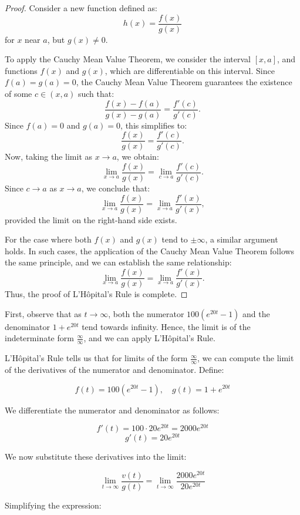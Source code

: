 \documentclass[12pt,a4paper]{article}
\begin{document}
\begin{remark}
\begin{proof}
Consider a new function defined as:
\[
h(x) = \frac{f(x)}{g(x)}
\]
for \( x \) near \( a \), but \( g(x) \neq 0 \).

To apply the Cauchy Mean Value Theorem, we consider the interval \( [x, a] \), and functions \( f(x) \) and \( g(x) \), which are differentiable on this interval. Since \( f(a) = g(a) = 0 \), the Cauchy Mean Value Theorem guarantees the existence of some \( c \in (x, a) \) such that:
\[
\frac{f(x) - f(a)}{g(x) - g(a)} = \frac{f'(c)}{g'(c)}.
\]
Since \( f(a) = 0 \) and \( g(a) = 0 \), this simplifies to:
\[
\frac{f(x)}{g(x)} = \frac{f'(c)}{g'(c)}.
\]
Now, taking the limit as \( x \to a \), we obtain:
\[
\lim_{x \to a} \frac{f(x)}{g(x)} = \lim_{c \to a} \frac{f'(c)}{g'(c)}.
\]
Since \( c \to a \) as \( x \to a \), we conclude that:
\[
\lim_{x \to a} \frac{f(x)}{g(x)} = \lim_{x \to a} \frac{f'(x)}{g'(x)},
\]
provided the limit on the right-hand side exists.

For the case where both \( f(x) \) and \( g(x) \) tend to \( \pm \infty \), a similar argument holds. In such cases, the application of the Cauchy Mean Value Theorem follows the same principle, and we can establish the same relationship:
\[
\lim_{x \to a} \frac{f(x)}{g(x)} = \lim_{x \to a} \frac{f'(x)}{g'(x)}.
\]
Thus, the proof of L'Hôpital's Rule is complete.
\end{proof}
\end{remark}
First, observe that as \( t \to \infty \), both the numerator \( 100(e^{20t} - 1) \) and the denominator \( 1 + e^{20t} \) tend towards infinity. Hence, the limit is of the indeterminate form \( \frac{\infty}{\infty} \), and we can apply L'Hôpital's Rule.

L'Hôpital's Rule tells us that for limits of the form \( \frac{\infty}{\infty} \), we can compute the limit of the derivatives of the numerator and denominator. Define:

\[
f(t) = 100(e^{20t} - 1), \quad g(t) = 1 + e^{20t}
\]

We differentiate the numerator and denominator as follows:

\[
f'(t) = 100 \cdot 20e^{20t} = 2000e^{20t}
\]
\[
g'(t) = 20e^{20t}
\]

We now substitute these derivatives into the limit:

\[
\lim_{t \to \infty} \frac{v(t)}{g(t)} = \lim_{t \to \infty} \frac{2000e^{20t}}{20e^{20t}}
\]

Simplifying the expression:
\end{document}
